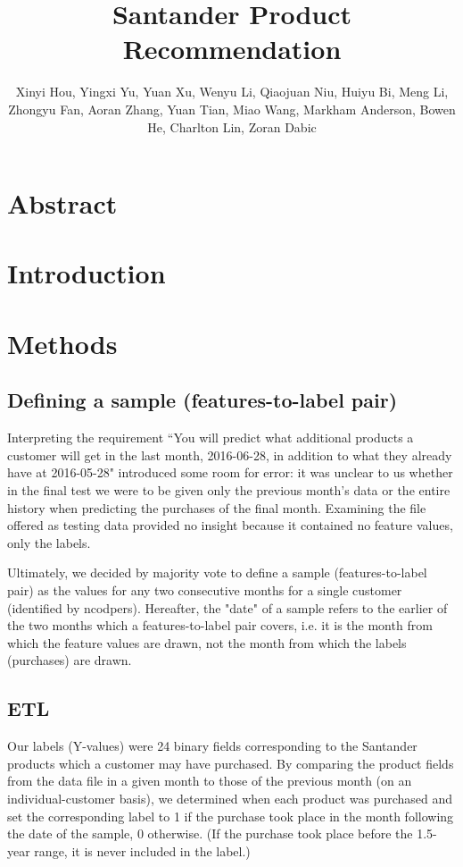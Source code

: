 \documentclass{report}
\begin{document}
	
\title{Santander Product Recommendation}

\author{Xinyi Hou,
	Yingxi Yu,
	Yuan Xu,
	Wenyu Li,
	Qiaojuan Niu,
	Huiyu Bi,
	Meng Li,
	Zhongyu Fan,
	Aoran Zhang,
	Yuan Tian,
	Miao Wang,
	Markham Anderson,
	Bowen He,
	Charlton Lin,
	Zoran Dabic}

\section{Abstract}

\section{Introduction}

\section{Methods}

\subsection{Defining a sample (features-to-label pair)}

Interpreting the requirement ``You will predict what additional products a customer will get in the last month, 2016-06-28, in addition to what they already have at 2016-05-28" introduced some room for error: it was unclear to us whether in the final test we were to be given only the previous month's data or the entire history when predicting the purchases of the final month. Examining the file offered as testing data provided no insight because it contained no feature values, only the labels.

Ultimately, we decided by majority vote to define a sample (features-to-label pair) as the values for any two consecutive months for a single customer (identified by ncodpers). Hereafter, the "date" of a sample refers to the earlier of the two months which a features-to-label pair covers, i.e. it is the month from which the feature values are drawn, not the month from which the labels (purchases) are drawn.

\subsection{ETL}

Our labels (Y-values) were 24 binary fields corresponding to the Santander products which a customer may have purchased. By comparing the product fields from the data file in a given month to those of the previous month (on an individual-customer basis), we determined when each product was purchased and set the corresponding label to 1 if the purchase took place in the month following the date of the sample, 0 otherwise. (If the purchase took place before the 1.5-year range, it is never included in the label.)
\end{document}
